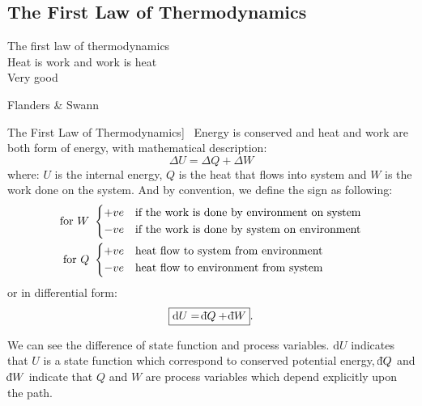 \documentclass[UTF8]{book}
\def\dbar{{\mathchar'26\mkern-12mu \mathrm{d}}}		%
\newenvironment{theorem}[2][Theorem]{\begin{trivlist}
\item[\hskip \labelsep {\bfseries #1}\hskip \labelsep {\bfseries }]}{\end{trivlist}}
\begin{document}
\subsection{The First Law of Thermodynamics}
\epigraph{The first law of thermodynamics\\
Heat is work and work is heat \\
Very good}{Flanders \& Swann}
\begin{theorem}
[The First Law of Thermodynamics]~  {Energy is conserved and heat and work are both form of energy, with mathematical description:}
$$\boxed{\Delta U=\Delta Q+\Delta W}$$
where: $U$ is the internal energy, $Q$ is the heat that flows into system and $W$ is the work done on the system.
{And by convention, we define the sign as following:}
\begin{align*}
 \textrm{for }W\ &
   \begin{dcases}
     +ve \quad  \textrm{if the work is done by environment on system}\\
     -ve \quad  \textrm{if the work is done by system on environment}
   \end{dcases}\\
 \textrm{for }Q\ &
   \begin{dcases}
     +ve \quad  \textrm{heat flow to system from environment}\\
     -ve \quad  \textrm{heat flow to environment from system}
   \end{dcases}
\end{align*}
 {or in differential form:}
$$\boxed{\mathrm{d} U=\dbar Q+\dbar W}.$$

We can see the difference of state function and process variables. $\mathrm{d}U$ indicates that $U$ is a state function which correspond to conserved potential energy, $\dbar Q$ and $\dbar W$ indicate that $Q$ and $W$ are process variables which depend explicitly upon the path.
\end{theorem}
\end{document}
